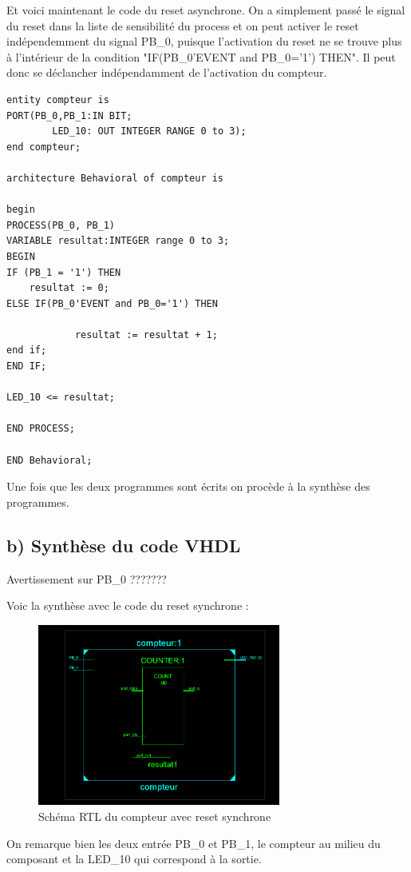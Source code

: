 \documentclass[11pt]{report}
\begin{document}
Et voici maintenant le code du reset asynchrone. On a simplement passé le signal du reset dans la liste de sensibilité du process et on peut activer le reset indépendemment du signal PB\_0, puisque l'activation du reset ne se trouve plus à l'intérieur de la condition "IF(PB\_0'EVENT and PB\_0='1') THEN". Il peut donc se déclancher indépendamment de l'activation du compteur. 


\begin{lstlisting}
entity compteur is
PORT(PB_0,PB_1:IN BIT;
		LED_10: OUT INTEGER RANGE 0 to 3);
end compteur;

architecture Behavioral of compteur is

begin
PROCESS(PB_0, PB_1)
VARIABLE resultat:INTEGER range 0 to 3;
BEGIN
IF (PB_1 = '1') THEN
	resultat := 0;
ELSE IF(PB_0'EVENT and PB_0='1') THEN

			resultat := resultat + 1;
end if;
END IF;

LED_10 <= resultat;

END PROCESS;

END Behavioral;

\end{lstlisting}

Une fois que les deux programmes sont écrits on procède à la synthèse des programmes. 
 
 \subsection{ b) Synthèse du code VHDL }
 
 Avertissement sur PB\_0 ???????
 
 Voic la synthèse avec le code du reset synchrone :
 \begin{figure}[h]
\includegraphics[width=8cm]{TP02-3.PNG}
\caption{Schéma RTL du compteur avec reset synchrone}
\end{figure}

On remarque bien les deux entrée PB\_0 et PB\_1, le compteur au milieu du composant et la LED\_10 qui correspond à la sortie. 
\end{document}
